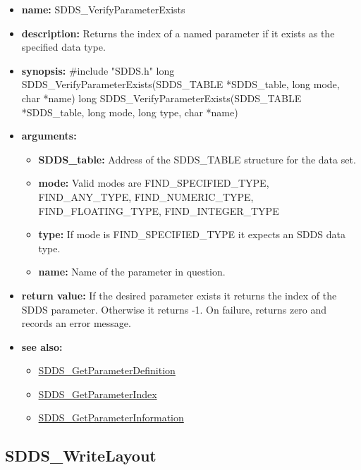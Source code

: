 \documentclass[11pt]{article}
\newcommand{\progref}[1]{\hyperref{SDDS_#1}{{\tt SDDS\_#1} (}{)}{SDDS_#1}}
\begin{document}
\begin{itemize}
\item {\bf name:}\newline
SDDS\_VerifyParameterExists
\item {\bf description:}\newline
Returns the index of a named parameter if it exists as the specified data type.
\item {\bf synopsis:} \#include "SDDS.h"\newline
long SDDS\_VerifyParameterExists(SDDS\_TABLE *SDDS\_table, long mode, char *name)
long SDDS\_VerifyParameterExists(SDDS\_TABLE *SDDS\_table, long mode, long type, char *name)
\item {\bf arguments:}
\begin{itemize}
\item {\bf SDDS\_table:} Address of the SDDS\_TABLE structure for the data set.
\item {\bf mode:} Valid modes are FIND\_SPECIFIED\_TYPE, FIND\_ANY\_TYPE, FIND\_NUMERIC\_TYPE, FIND\_FLOATING\_TYPE, FIND\_INTEGER\_TYPE
\item {\bf type:} If mode is FIND\_SPECIFIED\_TYPE it expects an SDDS data type.
\item {\bf name:} Name of the parameter in question.
\end{itemize}
\item {\bf return value:}\newline
If the desired parameter exists it returns the index of the SDDS parameter. Otherwise it returns -1.\newline
\newline
On failure, returns zero and records an error message. 
\item {\bf see also:}
\begin{itemize}
\item \progref{GetParameterDefinition}
\item \progref{GetParameterIndex}
\item \progref{GetParameterInformation}
\end{itemize}
\end{itemize}

\subsection{SDDS\_WriteLayout}
\label{SDDS_WriteLayout}
\end{document}
